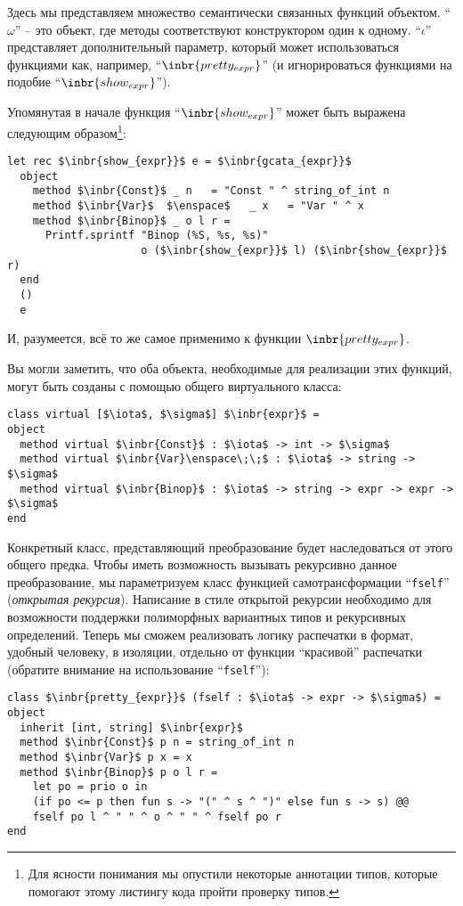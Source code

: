 Здесь мы представляем множество семантически связанных функций объектом. ``$\omega$'' -- это объект, где методы соответствуют конструктором
один к одному. ``$\iota$'' представляет дополнительный параметр, который может использоваться функциями как, например, ``$\inbr{pretty_{expr}}$'' (и игнорироваться функциями на подобие ``$\inbr{show_{expr}}$'').

Упомянутая в начале функция ``$\inbr{show_{expr}}$'' может быть выражена следующим образом\footnote{Для ясности понимания мы опустили некоторые аннотации типов, которые помогают этому листингу кода пройти проверку типов.}:

\begin{lstlisting}
let rec $\inbr{show_{expr}}$ e = $\inbr{gcata_{expr}}$
  object
    method $\inbr{Const}$ _ n   = "Const " ^ string_of_int n
    method $\inbr{Var}$  $\enspace$   _ x   = "Var " ^ x
    method $\inbr{Binop}$ _ o l r =
      Printf.sprintf "Binop (%S, %s, %s)" 
                     o ($\inbr{show_{expr}}$ l) ($\inbr{show_{expr}}$ r)
  end
  ()
  e
\end{lstlisting}

И, разумеется, всё то же  самое применимо к функции $\inbr{pretty_{expr}}$.

Вы могли заметить, что оба объекта, необходимые для реализации этих функций, могут быть созданы с помощью общего виртуального класса:

\begin{lstlisting}
class virtual [$\iota$, $\sigma$] $\inbr{expr}$ =
object
  method virtual $\inbr{Const}$ : $\iota$ -> int -> $\sigma$
  method virtual $\inbr{Var}\enspace\;\;$ : $\iota$ -> string -> $\sigma$
  method virtual $\inbr{Binop}$ : $\iota$ -> string -> expr -> expr -> $\sigma$  
end
\end{lstlisting}

Конкретный класс, представляющий преобразование будет наследоваться от этого общего предка. Чтобы иметь возможность 
вызывать рекурсивно данное преобразование, мы параметризуем класс функцией самотрансформации ``\lstinline{fself}'' 
(\emph{открытая рекурсия}). 
Написание в стиле открытой рекурсии необходимо для возможности поддержки полиморфных вариантных типов и рекурсивных определений.
Теперь мы сможем реализовать логику распечатки в формат, удобный человеку, в изоляции, отдельно от функции ``красивой'' распечатки
 (обратите внимание на использование ``\lstinline{fself}''):

\begin{lstlisting}
class $\inbr{pretty_{expr}}$ (fself : $\iota$ -> expr -> $\sigma$) = object 
  inherit [int, string] $\inbr{expr}$ 
  method $\inbr{Const}$ p n = string_of_int n
  method $\inbr{Var}$ p x = x
  method $\inbr{Binop}$ p o l r =
    let po = prio o in
    (if po <= p then fun s -> "(" ^ s ^ ")" else fun s -> s) @@
    fself po l ^ " " ^ o ^ " " ^ fself po r
end
\end{lstlisting}

